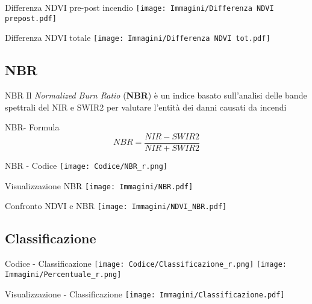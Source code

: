 \documentclass{beamer}
\begin{document}
\begin{frame}{Differenza NDVI pre-post incendio}
    \texttt{[image: Immagini/Differenza NDVI prepost.pdf]}
    \centering
\end{frame}

\begin{frame}{Differenza NDVI totale}
\texttt{[image: Immagini/Differenza NDVI tot.pdf]}
\centering
    \end{frame}
    
\subsection{NBR}
\begin{frame}{NBR}
Il \textit{Normalized Burn Ratio} (\textbf{NBR}) è un indice basato sull'analisi delle bande spettrali del NIR e SWIR2 per valutare l'entità dei danni causati da incendi    
\end{frame}

\begin{frame}{NBR- Formula}
\begin{equation}
    NBR = \frac{NIR - SWIR2}{NIR + SWIR2} 
\end{equation}
\end{frame}

\begin{frame}{NBR - Codice}
\texttt{[image: Codice/NBR\_r.png]}
\end{frame}

\begin{frame}{Visualizzazione NBR}
    \texttt{[image: Immagini/NBR.pdf]}
\end{frame}

\begin{frame}{Confronto NDVI e NBR}
    \texttt{[image: Immagini/NDVI\_NBR.pdf]}
\end{frame}
    
\subsection{Classificazione}
\begin{frame}{Codice - Classificazione}
\texttt{[image: Codice/Classificazione\_r.png]}
\texttt{[image: Immagini/Percentuale\_r.png]}
\centering  
\end{frame}

\begin{frame}{Visualizzazione - Classificazione}
\texttt{[image: Immagini/Classificazione.pdf]}
    \end{frame}
\end{document}
